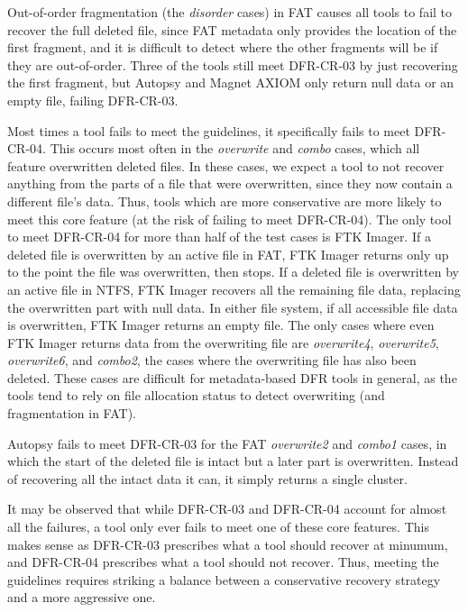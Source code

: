 Out-of-order fragmentation (the \emph{disorder} cases) in FAT causes all tools to fail to recover the full deleted file, since FAT metadata only provides the location of the first fragment, and it is difficult to detect where the other fragments will be if they are out-of-order.
Three of the tools still meet DFR-CR-03 by just recovering the first fragment, but Autopsy and Magnet AXIOM only return null data or an empty file, failing DFR-CR-03.

Most times a tool fails to meet the guidelines, it specifically fails to meet DFR-CR-04.
This occurs most often in the \emph{overwrite} and \emph{combo} cases, which all feature overwritten deleted files.
In these cases, we expect a tool to not recover anything from the parts of a file that were overwritten, since they now contain a different file's data.
Thus, tools which are more conservative are more likely to meet this core feature (at the risk of failing to meet DFR-CR-04).
The only tool to meet DFR-CR-04 for more than half of the test cases is FTK Imager.
If a deleted file is overwritten by an active file in FAT, FTK Imager returns only up to the point the file was overwritten, then stops.
If a deleted file is overwritten by an active file in NTFS, FTK Imager recovers all the remaining file data, replacing the overwritten part with null data.
In either file system, if all accessible file data is overwritten, FTK Imager returns an empty file.
The only cases where even FTK Imager returns data from the overwriting file are \emph{overwrite4}, \emph{overwrite5}, \emph{overwrite6}, and \emph{combo2}, the cases where the overwriting file has also been deleted.
These cases are difficult for metadata-based DFR tools in general, as the tools tend to rely on file allocation status to detect overwriting (and fragmentation in FAT).

Autopsy fails to meet DFR-CR-03 for the FAT \emph{overwrite2} and \emph{combo1} cases, in which the start of the deleted file is intact but a later part is overwritten.
Instead of recovering all the intact data it can, it simply returns a single cluster.

It may be observed that while DFR-CR-03 and DFR-CR-04 account for almost all the failures, a tool only ever fails to meet one of these core features.
This makes sense as DFR-CR-03 prescribes what a tool should recover at minumum, and DFR-CR-04 prescribes what a tool should not recover.
Thus, meeting the guidelines requires striking a balance between a conservative recovery strategy and a more aggressive one.

